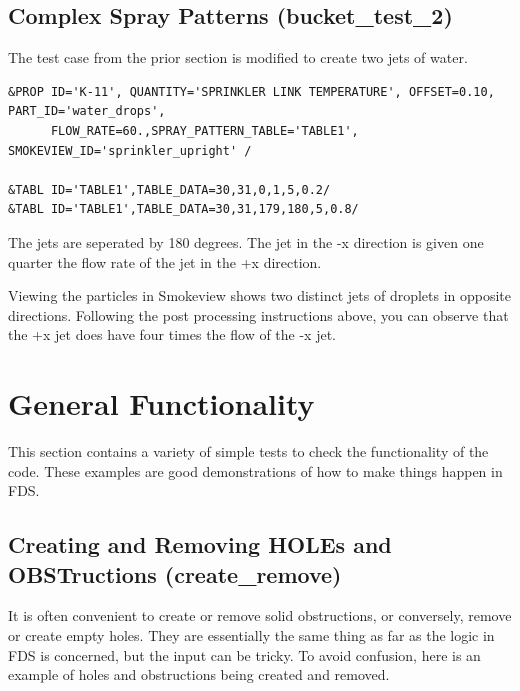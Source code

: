 \documentclass[11pt]{book}
\begin{document}
\normalsize \noindent


\subsection{Complex Spray Patterns ({\bf bucket\_test\_2}) }

The test case from the prior section is modified to create two jets of water.

\footnotesize
\begin{verbatim}
&PROP ID='K-11', QUANTITY='SPRINKLER LINK TEMPERATURE', OFFSET=0.10, PART_ID='water_drops', 
      FLOW_RATE=60.,SPRAY_PATTERN_TABLE='TABLE1', SMOKEVIEW_ID='sprinkler_upright' /

&TABL ID='TABLE1',TABLE_DATA=30,31,0,1,5,0.2/
&TABL ID='TABLE1',TABLE_DATA=30,31,179,180,5,0.8/
\end{verbatim}
\normalsize

The jets are seperated by 180 degrees.  
The jet in the {\ct -x} direction is given one quarter the flow rate of the jet in the {\ct +x} direction.

Viewing the particles in Smokeview shows two distinct jets of droplets in opposite directions.  
Following the post processing instructions above,  you can observe that
the {\ct +x} jet does have four times the flow of the {\ct -x} jet.

\clearpage

\section{General Functionality}

This section contains a variety of simple tests to check the functionality of the code. These examples are good demonstrations of how to
make things happen in FDS.


\subsection{Creating and Removing {\ct HOLE}s and {\ct OBST}ructions ({\bf create\_remove}) }

It is often convenient to create or remove solid obstructions, or conversely, remove or create empty holes. They are essentially the same thing as far as the logic in
FDS is concerned, but the input can be tricky. To avoid confusion, here is an example of holes and obstructions being created and removed.
\end{document}
